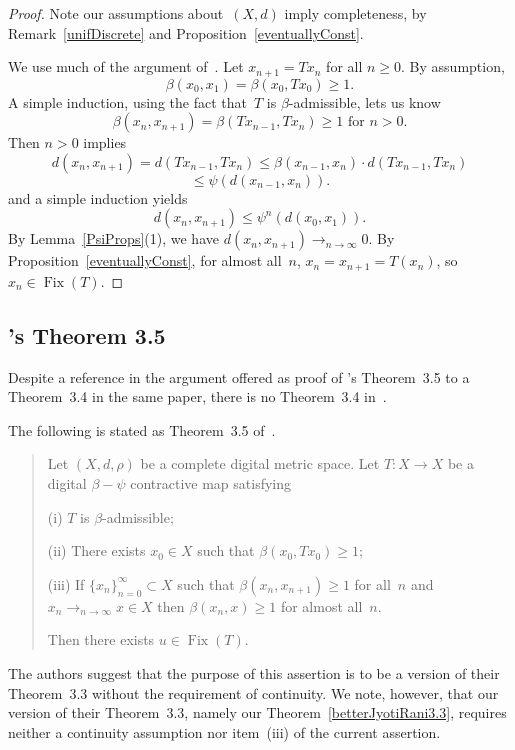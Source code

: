 \documentclass{article}
\numberwithin{thm}{section}
\DeclareMathOperator{\Fix}{Fix}
\begin{document}
\begin{proof}
Note our assumptions 
about~$(X,d)$ imply 
completeness, by
Remark~\ref{unifDiscrete}
and Proposition~\ref{eventuallyConst}.

We use much of the argument
of~\cite{JyotiRani17}.
    Let $x_{n+1} = Tx_n$
    for all $n \ge 0$.
    By assumption, 
    \[ \beta(x_0,x_1) =
    \beta(x_0,Tx_0) \ge 1.
    \]
    A simple induction, using the fact 
    that~$T$ is $\beta$-admissible,
    lets us know
    \[ \beta(x_n,x_{n+1}) =
    \beta(Tx_{n-1},Tx_n) \ge 1 \mbox{ for }
    n > 0.
    \]
    Then $n>0$ implies
    \[ d(x_n,x_{n+1}) =
    d(Tx_{n-1},Tx_n) \le
    \beta(x_{n-1},x_n) \cdot
    d(Tx_{n-1},Tx_n) 
    \]
    \[ \le \psi(d(x_{n-1},x_n)).
    \]
    and a simple induction
    yields
    \[ d(x_n,x_{n+1}) \le
    \psi^n(d(x_0,x_1)).
    \]
By Lemma~\ref{PsiProps}(1), we have
$d(x_n,x_{n+1}) \to_{n \to \infty} 0$. By
Proposition~\ref{eventuallyConst}, for
almost all~$n$,
$x_n = x_{n+1} = T(x_n)$, so
$x_n \in \Fix(T)$.
\end{proof}

\subsection{\cite{JyotiRani17}'s Theorem 3.5}
Despite a reference
in the argument
offered as proof of
\cite{JyotiRani17}'s Theorem~3.5 to
a Theorem~3.4 in
the same paper,
there is no 
Theorem~3.4 
in~\cite{JyotiRani17}.

The following is
stated as Theorem~3.5
of~\cite{JyotiRani17}.

\begin{quote}
    Let $(X,d,\rho)$
    be a complete digital metric space. Let
    $T: X \to X$ be a digital
    $\beta-\psi$
    contractive map
    satisfying

    (i) $T$ is
    $\beta$-admissible;

    (ii) There exists $x_0 \in X$
    such that 
    $\beta(x_0,Tx_0) \ge 1$;

    (iii) If
    $\{x_n\}_{n=0}^{\infty} \subset X$ such that
    $\beta(x_n,x_{n+1}) \ge 1$ for
    all~$n$ and
    $x_n \to_{n \to \infty} x \in X$ then
    $\beta(x_n,x) \ge 1$ for
    almost all~$n$.

    Then there exists $u \in \Fix(T)$.
\end{quote}

The authors suggest
that the purpose of
this assertion is 
to be a version of
their Theorem~3.3
without the requirement of 
continuity. We note, however, that
our version of
their Theorem~3.3,
namely our Theorem~\ref{betterJyotiRani3.3},
requires neither a
continuity assumption nor item~(iii) of the current assertion.
\end{document}
